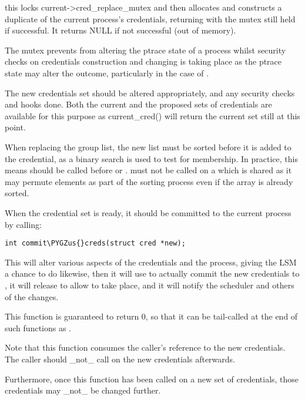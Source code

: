 \documentclass[a4paper,8pt,english]{sphinxmanual}
\def\PYGZus{\char`\_}
\begin{document}
this locks current-\textgreater{}cred\_replace\_mutex and then allocates and constructs a
duplicate of the current process's credentials, returning with the mutex still
held if successful.  It returns NULL if not successful (out of memory).

The mutex prevents  from altering the ptrace state of a process
whilst security checks on credentials construction and changing is taking place
as the ptrace state may alter the outcome, particularly in the case of
.

The new credentials set should be altered appropriately, and any security
checks and hooks done.  Both the current and the proposed sets of credentials
are available for this purpose as current\_cred() will return the current set
still at this point.

When replacing the group list, the new list must be sorted before it
is added to the credential, as a binary search is used to test for
membership.  In practice, this means  should be
called before  or .
 must not be called on a  which
is shared as it may permute elements as part of the sorting process
even if the array is already sorted.

When the credential set is ready, it should be committed to the current process
by calling:

\begin{Verbatim}[commandchars=\\\{\}]
int commit\PYGZus{}creds(struct cred *new);
\end{Verbatim}

This will alter various aspects of the credentials and the process, giving the
LSM a chance to do likewise, then it will use  to
actually commit the new credentials to , it will release
 to allow  to take place, and it
will notify the scheduler and others of the changes.

This function is guaranteed to return 0, so that it can be tail-called at the
end of such functions as .

Note that this function consumes the caller's reference to the new credentials.
The caller should \_not\_ call  on the new credentials afterwards.

Furthermore, once this function has been called on a new set of credentials,
those credentials may \_not\_ be changed further.
\end{document}
